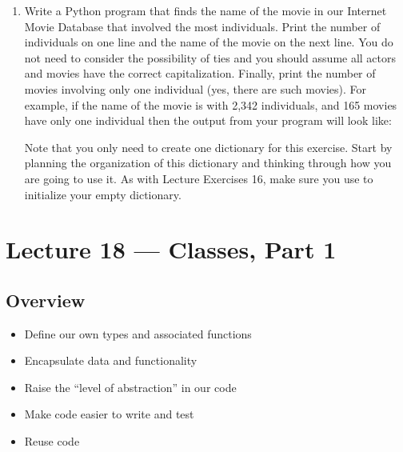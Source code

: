 \documentclass[letterpaper,10pt,english]{sphinxmanual}
\begin{document}
\begin{enumerate}
\item {} 
Write a Python program that finds the name of the movie in our
Internet Movie Database that involved the most  individuals. Print
the number of individuals on one line and the name of the movie on
the next line. You do not need to consider the possibility of
ties and you should assume all actors and movies have the correct
capitalization. Finally, print the number of movies involving only one
individual (yes, there are such movies). For example, if the name
of the movie is  with 2,342 individuals, and 165 movies
have only one individual then the output from your program will
look like:

\begin{sphinxVerbatim}[commandchars=\\\{\}]
        
 
\end{sphinxVerbatim}

Note that you only need to create one dictionary for this
exercise. Start by planning the organization of this dictionary
and thinking through how you are going to use it. As with Lecture Exercises
16, make sure you use  to initialize your empty dictionary.

\end{enumerate}


\chapter{Lecture 18 — Classes, Part 1}
\label{\detokenize{lecture_notes/lec18_classes1:lecture-18-classes-part-1}}\label{\detokenize{lecture_notes/lec18_classes1::doc}}

\section{Overview}
\label{\detokenize{lecture_notes/lec18_classes1:overview}}\begin{itemize}
\item {} 
Define our own types and associated functions

\item {} 
Encapsulate data and functionality

\item {} 
Raise the “level of abstraction” in our code

\item {} 
Make code easier to write and test

\item {} 
Reuse code

\end{itemize}
\end{document}

